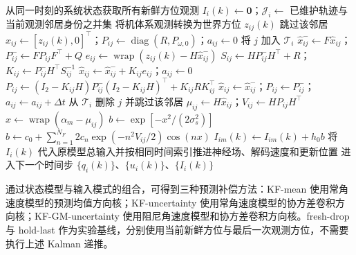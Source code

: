\documentclass[UTF8,fontset=windows,11pt]{ctexart}
\begin{document}
\begin{algorithm}[htbp]
 \ContinuedFloat
 \caption{（续）：输入构造及闭环推进}
 \scriptsize
 \begin{algorithmic}
  \State 从同一时刻的系统状态获取所有新鲜方位观测
   \State $I_i(k)\leftarrow\mathbf 0$；$\mathcal J_i\leftarrow$ 已维护轨迹与当前观测邻居身份之并集
     \State 将机体系观测转换为世界方位 $z_{ij}(k)$
    \EndIf
      \State 跳过该邻居
     \Else
      \State $\hat x_{ij}\leftarrow[z_{ij}(k),0]^\top$；$P_{ij}\leftarrow\operatorname{diag}(R,P_{\omega,0})$；$a_{ij}\leftarrow0$
      \State 将 $j$ 加入 $\mathcal T_i$
     \EndIf
    \Else
     \State $\hat x^-_{ij}\leftarrow F\hat x_{ij}$；$P^-_{ij}\leftarrow FP_{ij}F^\top+Q$
      \State $e_{ij}\leftarrow\operatorname{wrap}(z_{ij}(k)-H\hat x^-_{ij})$
      \State $S_{ij}\leftarrow HP^-_{ij}H^\top+R$；$K_{ij}\leftarrow P^-_{ij}H^\top S_{ij}^{-1}$
      \State $\hat x_{ij}\leftarrow\hat x^-_{ij}+K_{ij}e_{ij}$；$a_{ij}\leftarrow0$
      \State $P_{ij}\leftarrow(I_2-K_{ij}H)P^-_{ij}(I_2-K_{ij}H)^\top+K_{ij}RK_{ij}^\top$
     \Else
      \State $\hat x_{ij}\leftarrow\hat x^-_{ij}$；$P_{ij}\leftarrow P^-_{ij}$；$a_{ij}\leftarrow a_{ij}+\Delta t$
     \EndIf
      \State 从 $\mathcal T_i$ 删除 $j$ 并跳过该邻居
     \EndIf
     \State $\mu_{ij}\leftarrow H\hat x_{ij}$；$V_{ij}\leftarrow HP_{ij}H^\top$
      \State $x\leftarrow\operatorname{wrap}(\alpha_m-\mu_{ij})$
       \State $b\leftarrow\exp[-x^2/(2\sigma_s^2)]$
      \Else
       \State $b\leftarrow c_0+\sum_{n=1}^{N_F}2c_n\exp(-n^2V_{ij}/2)\cos(nx)$
      \EndIf
      \State $I_{im}(k)\leftarrow I_{im}(k)+h_0b$
     \EndFor
    \EndIf
   \EndFor
   \State 将 $I_i(k)$ 代入原模型总输入并按相同时间索引推进神经场、解码速度和更新位置
  \EndFor
  \State 进入下一个时间步
 \EndFor
 \State \Return $\{q_i(k)\}$、$\{u_i(k)\}$、$\{I_i(k)\}$
 \end{algorithmic}
\end{algorithm}
\clearpage

通过状态模型与输入模式的组合，可得到三种预测补偿方法：KF-mean 使用常角速度模型的预测均值方向核；KF-uncertainty 使用常角速度模型的协方差卷积方向核；KF-GM-uncertainty 使用阻尼角速度模型和协方差卷积方向核。fresh-drop 与 hold-last 作为实验基线，分别使用当前新鲜方位与最后一次观测方位，不需要执行上述 Kalman 递推。
\end{document}
